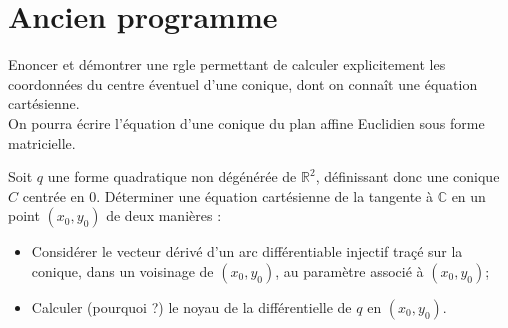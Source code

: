 \section{Ancien programme}

\begin{exer}
Enoncer et d\'emontrer une rgle permettant de calculer explicitement les coordonnées du centre \'eventuel d'une conique, %
dont on conna\^it une équation cart\'esienne.\\
On pourra écrire l'équation d'une conique du plan affine Euclidien sous forme matricielle.
\end{exer}

\begin{exer}
Soit $q$ une forme quadratique non d\'eg\'en\'er\'ee de $\mathbb{R}^2$, d\'efinissant donc une conique $C$ centrée en $0$. %
D\'eterminer une équation cartésienne de la tangente à $\mathbb{C}$ en un point $(x_0,y_0)$ de deux manières :
\begin{itemize}
\item Considérer le vecteur dérivé d'un arc différentiable injectif traçé sur la conique, %
dans un voisinage de $(x_0,y_0)$, au paramètre associé à $(x_0,y_0)$;
\item Calculer (pourquoi ?) le noyau de la différentielle de $q$ en $(x_0,y_0)$.
\end{itemize}
\end{exer}